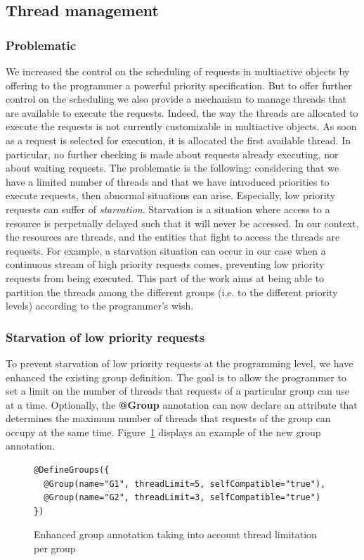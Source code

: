 \documentclass[11pt]{report}
\begin{document}
\subsection{Thread management}
\subsubsection{Problematic}
We increased the control on the scheduling of requests in multiactive objects by offering to the programmer a powerful priority specification. But to offer further control on the scheduling we also provide a mechanism to manage threads that are available to execute the requests. Indeed, the way the threads are allocated to execute the requests is not currently customizable in multiactive objects. As soon as a request is selected for execution, it is allocated the first available thread. In particular, no further checking is made about requests already executing, nor about waiting requests. The problematic is the following: considering that we have a limited number of threads and that we have introduced priorities to execute requests, then abnormal situations can arise. Especially, low priority requests can suffer of \emph{starvation}. Starvation is a situation where access to a resource is perpetually delayed such that it will never be accessed. In our context, the resources are threads, and the entities that fight to access the threads are requests. For example, a starvation situation can occur in our case when a continuous stream of high priority requests comes, preventing low priority requests from being executed. 
This part of the work aims at being able to partition the threads among the different groups (i.e. to the different priority levels) according to the programmer's wish. 

\subsubsection{Starvation of low priority requests}
To prevent starvation of low priority requests at the programming level, we have enhanced the existing group definition. The goal is to allow the programmer to set a limit on the number of threads that requests of a particular group can use at a time. Optionally, the \textbf{@Group} annotation can now declare an attribute that determines the maximum number of threads that requests of the group can occupy at the same time. Figure~\ref{fig:new_groups} displays an example of the new group annotation.

\begin{figure}[!ht]
	\lstset{language=java, numbers=left, numberstyle=\tiny, stepnumber=1, numbersep=5pt, basicstyle=\footnotesize}
	\begin{lstlisting}[frame=single]
@DefineGroups({
  @Group(name="G1", threadLimit=5, selfCompatible="true"),
  @Group(name="G2", threadLimit=3, selfCompatible="true")
})
 	\end{lstlisting}
\caption{Enhanced group annotation taking into account thread limitation per group}
\label{fig:new_groups}
\end{figure}
\end{document}
